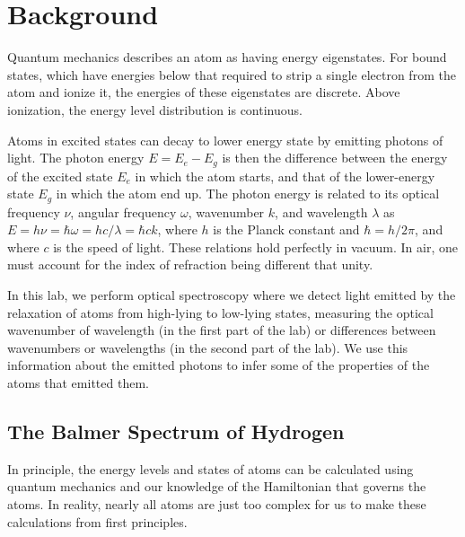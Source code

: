 \documentclass{../lab}
\begin{document}

\section{Background}

Quantum mechanics describes an atom as having energy eigenstates.  For bound states, which have energies below that required to strip a single electron from the atom and ionize it, the energies of these eigenstates are discrete.  Above ionization, the energy level distribution is continuous.

Atoms in excited states can decay to lower energy state by emitting photons of light.  The photon energy $E = E_e - E_g$ is then the difference between the energy of the excited state $E_e$ in which the atom starts, and that of the lower-energy state $E_g$ in which the atom end up.  The photon energy is related to its optical frequency $\nu$, angular frequency $\omega$, wavenumber $k$, and wavelength $\lambda$ as $E = h \nu = \hbar \omega = h c/\lambda = \hbar c k$, where $h$ is the Planck constant and $\hbar = h/2\pi$, and where $c$ is the speed of light.  These relations hold perfectly in vacuum.  In air, one must account for the index of refraction being different that unity.

In this lab, we perform optical spectroscopy where we detect light emitted by the relaxation of atoms from high-lying to low-lying states, measuring the optical wavenumber of wavelength (in the first part of the lab) or differences between wavenumbers or wavelengths (in the second part of the lab).  We use this information about the emitted photons to infer some of the properties of the atoms that emitted them.

\subsection{The Balmer Spectrum of Hydrogen}

In principle, the energy levels and states of atoms can be calculated using quantum mechanics and our knowledge of the Hamiltonian that governs the atoms.  In reality, nearly all atoms are just too complex for us to make these calculations from first principles.
\end{document}
